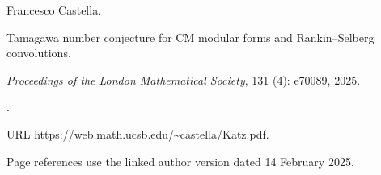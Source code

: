 Francesco Castella.

\newblock Tamagawa number conjecture for {CM} modular forms and
  {R}ankin--{S}elberg convolutions.

\newblock \emph{Proceedings of the London Mathematical Society}, 131
  (4): e70089, 2025.

\newblock {}.

\newblock URL \url{https://web.math.ucsb.edu/~castella/Katz.pdf}.

\newblock Page references use the linked author version dated 14 February 2025.
